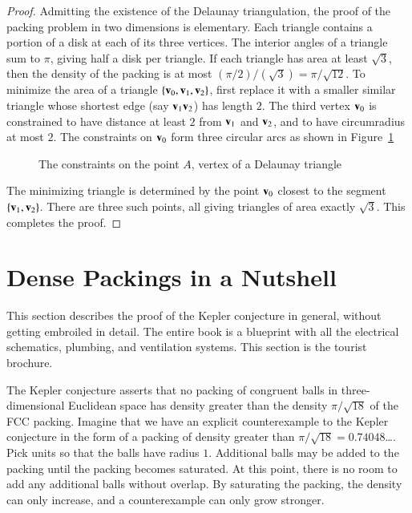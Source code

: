 \begin{proof}
  Admitting the existence of the Delaunay triangulation, the proof of
  the packing problem in two dimensions is elementary.  Each 
  triangle contains a portion of a disk at each of its three vertices.
  The interior angles of a triangle sum to $\pi$, giving half a disk
  per triangle.  If each triangle has area at least $\sqrt{3}$, then
  the density of the packing is at most $(\pi/2)/(\sqrt{3}) =
  \pi/\sqrt{12}$.  To minimize the area of a triangle
  $\{{\mathbf v}_0,{\mathbf v}_1,{\mathbf v}_2\}$, first replace it with a smaller similar triangle
  whose shortest edge (say ${\mathbf v}_1{\mathbf v}_2$) has length $2$.  The third vertex
  ${\mathbf v}_0$ is constrained to have distance at least $2$ from ${\mathbf v}_1$ and
  ${\mathbf v}_2$, and to have circumradius at most $2$.  The constraints on
  ${\mathbf v}_0$ form three circular arcs as shown in
  Figure~\ref{fig:2D-FT} %

\begin{figure}[htb]
  \centering
  \caption{The constraints on the point $A$, vertex of a Delaunay triangle}
  \label{fig:2D-FT}
\end{figure}

The minimizing triangle is determined by the point ${\mathbf v}_0$ closest to
the segment $\{{\mathbf v}_1,{\mathbf v}_2\}$.  There are three such points, all giving
triangles of area exactly $\sqrt3$.  This completes the proof.
\end{proof}

\section{Dense Packings in a Nutshell}

This section describes the proof of the Kepler conjecture in general,
without
getting embroiled in detail.  The entire book
is a blueprint with all the electrical schematics, plumbing, and
ventilation systems.  This section is the tourist brochure.

The Kepler conjecture asserts that no packing of congruent balls in
three-dimensional Euclidean space has density greater than the density
$\pi/\sqrt{18}$ of the FCC packing.  Imagine that we
have an explicit counterexample to the Kepler conjecture in the form of a
packing of density greater than $\pi/\sqrt{18}= 0.74048$\dots.  Pick
units so that the balls have radius $1$.  Additional balls may be
added to the packing until the packing becomes saturated.  At this
point, there is no room to add any additional balls without overlap.
By saturating the packing, the density can only increase, and a
counterexample can only grow stronger.

